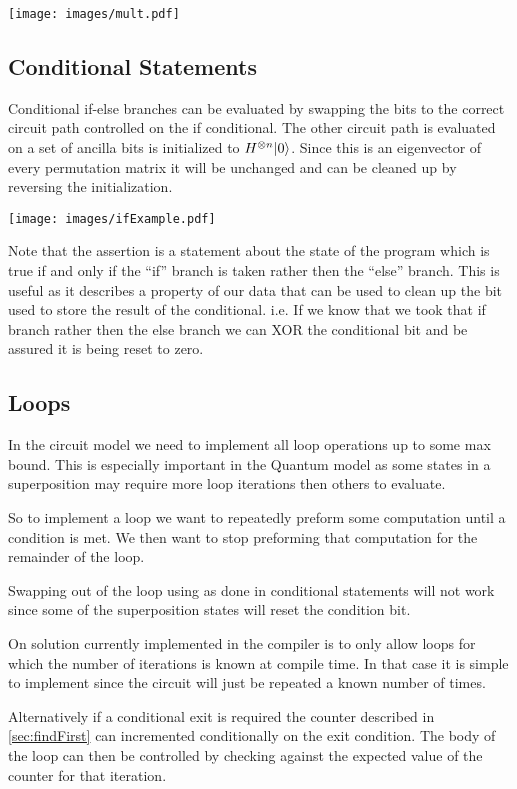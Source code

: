 
\texttt{[image: images/mult.pdf]}

\subsection{Conditional Statements}
Conditional if-else branches can be evaluated by swapping the bits to the correct circuit path controlled on the if conditional.
The other circuit path is evaluated on a set of ancilla bits is initialized to $H^{\otimes n}{\left\vert{0}\right\rangle}$.
Since this is an eigenvector of every permutation matrix it will be unchanged and can be cleaned up by reversing the initialization.


\texttt{[image: images/ifExample.pdf]}

Note that the assertion is a statement about the state of the program which is true if and only if the ``if'' branch is taken rather then the ``else'' branch.
This is useful as it describes a property of our data that can be used to clean up the bit used to store the result of the conditional.
i.e. If we know that we took that if branch rather then the else branch we can XOR the conditional bit and be assured it is being reset to zero.


\subsection{Loops}
In the circuit model we need to implement all loop operations up to some max
bound. This is especially important in the Quantum model as some states in a
superposition may require more loop iterations then others to evaluate.

So to implement a loop we want to repeatedly preform some computation until a
condition is met. We then want to stop preforming that computation for the
remainder of the loop.

Swapping out of the loop using as done in conditional statements will not work
since some of the superposition states will reset the condition bit.

On solution currently implemented in the compiler is to only allow loops for
which the number of iterations is known at compile time. In that case it is
simple to implement since the circuit will just be repeated a known number of
times.

Alternatively if a conditional exit is required the counter described in
\cref{sec:findFirst} can incremented conditionally on the exit condition.
The body of the loop can then be controlled by checking against the expected
value of the counter for that iteration.
